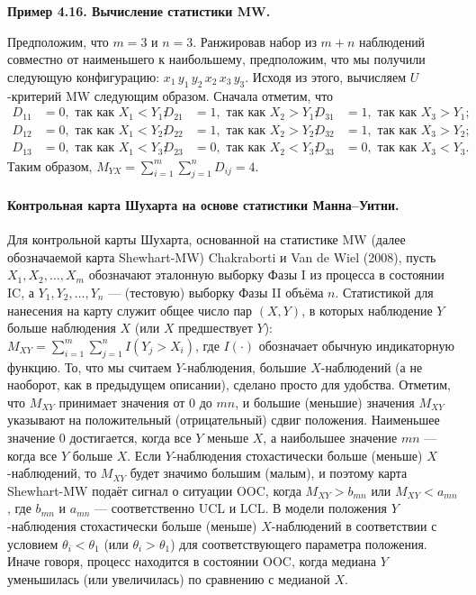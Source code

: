 \noindent\textbf{Пример 4.16. Вычисление статистики MW.}

Предположим, что \(m = 3\) и \(n = 3\). Ранжировав набор из \(m + n\) наблюдений совместно от наименьшего к наибольшему, предположим, что мы получили следующую конфигурацию: \(x_1\, y_1\, y_2\, x_2\, x_3\, y_3\). Исходя из этого, вычисляем \(U\)-критерий MW следующим образом. Сначала отметим, что
\begin{align*}
	D_{11} &= 0, \text{ так как } X_1 < Y_1; & D_{21} &= 1, \text{ так как } X_2 > Y_1; & D_{31} &= 1, \text{ так как } X_3 > Y_1; \\
	D_{12} &= 0, \text{ так как } X_1 < Y_2; & D_{22} &= 1, \text{ так как } X_2 > Y_2; & D_{32} &= 1, \text{ так как } X_3 > Y_2; \\
	D_{13} &= 0, \text{ так как } X_1 < Y_3; & D_{23} &= 0, \text{ так как } X_2 < Y_3; & D_{33} &= 0, \text{ так как } X_3 < Y_3.
\end{align*}
Таким образом, \(M_{YX} = \sum_{i=1}^{m}\sum_{j=1}^{n} D_{ij} = 4\).

\paragraph{Контрольная карта Шухарта на основе статистики Манна--Уитни.} Для контрольной карты Шухарта, основанной на статистике MW (далее обозначаемой карта Shewhart-MW) Chakraborti и Van de Wiel (2008), пусть \(X_1, X_2, \ldots, X_m\) обозначают эталонную выборку Фазы I из процесса в состоянии IC, а \(Y_1, Y_2, \ldots, Y_n\) --- (тестовую) выборку Фазы II объёма \(n\). Статистикой для нанесения на карту служит общее число пар \((X, Y)\), в которых наблюдение \(Y\) больше наблюдения \(X\) (или \(X\) предшествует \(Y\)): \(M_{XY} = \sum_{i=1}^{m}\sum_{j=1}^{n} I\left( Y_j > X_i \right)\), где \(I(\cdot)\) обозначает обычную индикаторную функцию. То, что мы считаем \(Y\)-наблюдения, большие \(X\)-наблюдений (а не наоборот, как в предыдущем описании), сделано просто для удобства. Отметим, что \(M_{XY}\) принимает значения от 0 до \(mn\), и большие (меньшие) значения \(M_{XY}\) указывают на положительный (отрицательный) сдвиг положения. Наименьшее значение 0 достигается, когда все \(Y\) меньше \(X\), а наибольшее значение \(mn\) --- когда все \(Y\) больше \(X\). Если \(Y\)-наблюдения стохастически больше (меньше) \(X\)-наблюдений, то \(M_{XY}\) будет значимо большим (малым), и поэтому карта Shewhart-MW подаёт сигнал о ситуации OOC, когда \(M_{XY} > b_{mn}\) или \(M_{XY} < a_{mn}\), где \(b_{mn}\) и \(a_{mn}\) --- соответственно UCL и LCL. В модели положения \(Y\)-наблюдения стохастически больше (меньше) \(X\)-наблюдений в соответствии с условием \(\theta_i < \theta_1\) (или \(\theta_i > \theta_1\)) для соответствующего параметра положения. Иначе говоря, процесс находится в состоянии OOC, когда медиана \(Y\) уменьшилась (или увеличилась) по сравнению с медианой \(X\).

